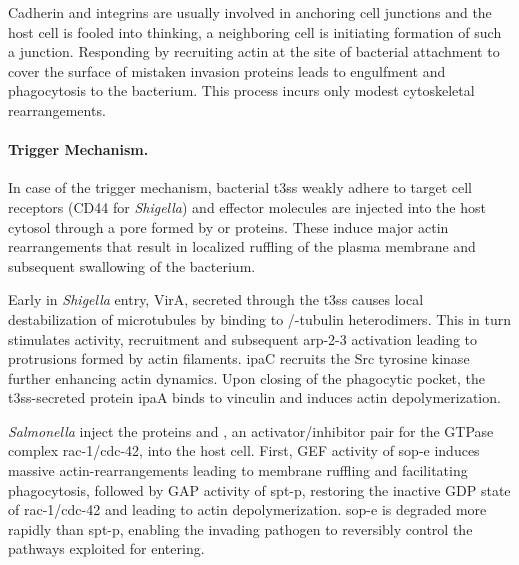Cadherin and integrins are usually involved in anchoring cell junctions and the host cell is fooled into thinking, a neighboring cell is initiating formation of such a junction. Responding by recruiting actin at the site of bacterial attachment to cover the surface of mistaken invasion proteins leads to engulfment and phagocytosis to the bacterium. This process incurs only modest cytoskeletal rearrangements. 


\paragraph{Trigger Mechanism.}
In case of the trigger mechanism, bacterial \gls{t3ss} weakly adhere to target cell receptors (CD44 for \textit{Shigella}) and effector molecules are injected into the host cytosol through a pore formed by  or  proteins. These induce major actin rearrangements that result in localized ruffling of the plasma membrane and subsequent swallowing of the bacterium.


Early in \textit{Shigella} entry, VirA, secreted through the \gls{t3ss} causes local destabilization of microtubules by binding to \textalpha/\textbeta-tubulin heterodimers. This in turn stimulates  activity,  recruitment and subsequent \gls{arp-2-3} activation leading to protrusions formed by actin filaments. \Gls{ipa}C recruits the Src tyrosine kinase further enhancing actin dynamics. Upon closing of the phagocytic pocket, the \gls{t3ss}-secreted protein \gls{ipa}A binds to vinculin and induces actin depolymerization.


\textit{Salmonella} inject the proteins  and , an activator/inhibitor pair for the GTPase complex \gls{rac-1}/\gls{cdc-42}, into the host cell. First, GEF activity of \gls{sop-e} induces massive actin-rearrangements leading to membrane ruffling and facilitating phagocytosis, followed by GAP activity of \gls{spt-p}, restoring the inactive GDP state of \gls{rac-1}/\gls{cdc-42} and leading to actin depolymerization. \Gls{sop-e} is degraded more rapidly than \gls{spt-p}, enabling the invading pathogen to reversibly control the pathways exploited for entering.

